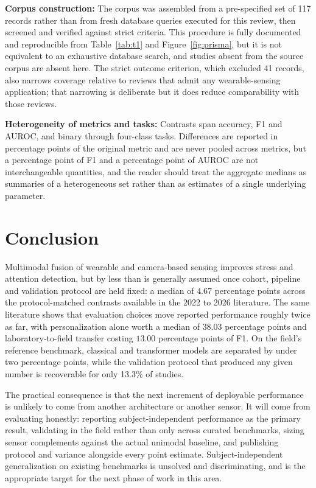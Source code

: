 \textbf{Corpus construction:} The corpus was assembled from a pre-specified set of 117 records
rather than from fresh database queries executed for this review, then screened and verified
against strict criteria. This procedure is fully documented and reproducible from
Table~\ref{tab:t1} and Figure~\ref{fig:prisma}, but it is not equivalent to an exhaustive
database search, and studies absent from the source corpus are absent here. The strict
outcome criterion, which excluded 41 records, also narrows coverage relative to reviews that
admit any wearable-sensing application; that narrowing is deliberate but it does reduce
comparability with those reviews.

\textbf{Heterogeneity of metrics and tasks:} Contrasts span accuracy, F1 and AUROC, and
binary through four-class tasks. Differences are reported in percentage points of the
original metric and are never pooled across metrics, but a percentage point of F1 and a
percentage point of AUROC are not interchangeable quantities, and the reader should treat
the aggregate medians as summaries of a heterogeneous set rather than as estimates of a
single underlying parameter.

\section{Conclusion}
Multimodal fusion of wearable and camera-based sensing improves stress and attention
detection, but by less than is generally assumed once cohort, pipeline and validation
protocol are held fixed: a median of $4.67$ percentage points across the protocol-matched
contrasts available in the 2022 to 2026 literature. The same literature shows that evaluation
choices move reported performance roughly twice as far, with personalization alone worth a
median of $38.03$ percentage points and laboratory-to-field transfer costing $13.00$
percentage points of F1. On the field's reference benchmark, classical and transformer models
are separated by under two percentage points, while the validation protocol that produced any
given number is recoverable for only 13.3\% of studies.

The practical consequence is that the next increment of deployable performance is unlikely to
come from another architecture or another sensor. It will come from evaluating honestly:
reporting subject-independent performance as the primary result, validating in the field
rather than only across curated benchmarks, sizing sensor complements against the actual
unimodal baseline, and publishing protocol and variance alongside every point estimate.
Subject-independent generalization on existing benchmarks is unsolved and discriminating, and
is the appropriate target for the next phase of work in this area.
